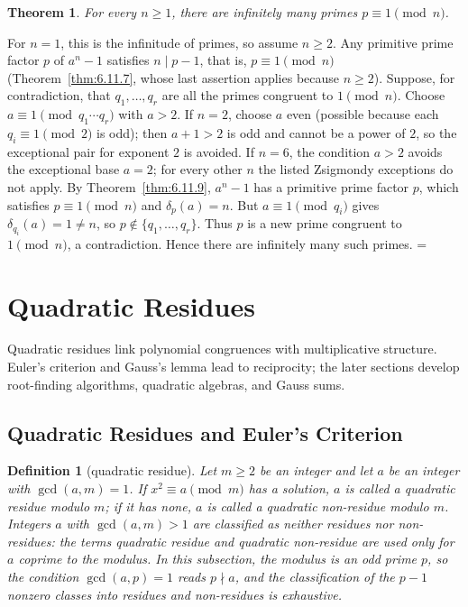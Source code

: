 \documentclass[11pt]{article}
\makeatletter
\let\nt@closedisplay\]
\def\nt@guardedclose{\@ifnextchar\par{\nt@closeafterpar}{\@ifnextchar\end{\postdisplaypenalty\@M\nt@closedisplay}{\nt@closedisplay}}}
\def\nt@closeafterpar\par{\@ifnextchar\par{\nt@closeafterpar}{\@ifnextchar\end{\postdisplaypenalty\@M\nt@closedisplay\par}{\nt@closedisplay\par}}}
\renewenvironment{proof}[1][\proofname]{\par
  \pushQED{\qed}\normalfont\topsep\medskipamount\edef\nt@afterproof{\@endparpenalty=\the\@endparpenalty\relax}\@beginparpenalty\@M\@endparpenalty\@M\let\]\nt@guardedclose\trivlist\item[]\textit{#1\@addpunct{.}} \ignorespaces}{\ifvmode\addpenalty\@M\fi\popQED\nt@afterproof\endtrivlist\@endpefalse}
\theoremstyle{ntstyle}
\newtheorem{theorem}{Theorem}[subsection]
\newtheorem{definition}{Definition}[subsection]
\makeatother
\begin{document}
\begin{theorem}\label{thm:6.11.10} For every $n \ge 1$, there are infinitely many
  primes $p \equiv 1 \pmod{n}$.

\end{theorem}

\begin{proof} For $n = 1$, this is the infinitude of
  primes, so assume $n \ge 2$. Any primitive prime factor $p$ of $a^{n} - 1$ satisfies $n \mid p - 1$, that is,
  $p \equiv 1 \pmod{n}$ (Theorem~\ref{thm:6.11.7}, whose last assertion applies because $n \ge 2$). Suppose, for
  contradiction, that $q_1, \ldots, q_r$ are all
  the primes congruent to $1 \pmod{n}$. Choose $a\equiv1\pmod{q_1\cdots q_r}$ with $a>2$. If $n=2$, choose $a$ even
  (possible because each $q_i\equiv1\pmod{2}$ is odd); then $a+1>2$ is odd and cannot be a power of $2$, so the
  exceptional pair for exponent $2$ is avoided. If $n=6$, the condition $a>2$ avoids the exceptional base $a=2$;
  for every other $n$ the listed Zsigmondy exceptions do not apply. By Theorem~\ref{thm:6.11.9}, $a^{n} - 1$ has a
  primitive
  prime factor $p$, which satisfies $p \equiv 1 \pmod{n}$ and
  $\delta_p(a) = n$. But $a \equiv 1 \pmod{q_i}$ gives
  $\delta_{q_i}(a) = 1 \neq n$, so $p \notin \{q_1, \ldots, q_r\}$. Thus $p$ is a new prime congruent to
  $1 \pmod{n}$, a contradiction. Hence there
  are infinitely many such primes.
\end{proof}
\newpage


\section{Quadratic Residues}

Quadratic residues link polynomial congruences with multiplicative structure. Euler’s criterion and Gauss’s lemma
lead to reciprocity; the later sections develop root-finding algorithms, quadratic algebras, and Gauss sums.


\subsection{Quadratic Residues and Euler's Criterion}

\begin{definition}[quadratic residue]\label{def:7.1.1}\label{def:quadratic-residue}
  Let $m \ge 2$ be an integer and let
  $a$ be an integer with $\gcd(a, m) = 1$. If $x^{2} \equiv a \pmod{m}$
  has a solution, $a$ is called a quadratic residue modulo $m$; if it
  has none, $a$ is called a quadratic non-residue modulo $m$. Integers
  $a$ with $\gcd(a, m) > 1$ are classified as neither residues nor non-residues: the terms
  quadratic residue and quadratic non-residue are used only for $a$
  coprime to the modulus. In this subsection, the modulus is an odd prime
  $p$, so the condition $\gcd(a, p) = 1$ reads $p \nmid a$, and the
  classification of the $p-1$ nonzero classes into residues and
  non-residues is exhaustive.

\end{definition}
\end{document}

